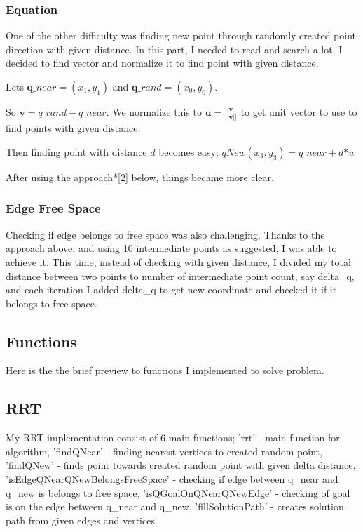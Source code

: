 \documentclass{article}
\begin{document}
		\subsubsection{Equation}
		One of the other difficulty was finding new point through randomly created point direction with given distance. In this part, I needed to read and search a lot. I decided to find vector and normalize it to find point with given distance. \par
		Lets $\mathbf q\_near = (x_1, y_1)$ and $\mathbf q\_rand = (x_0, y_0).$
		
		So $\mathbf v = q\_rand - q\_near $. We normalize this to $\mathbf u = \frac{\mathbf v}{||\mathbf v||}$ to get unit vector to use to find points with given distance.
		
		Then finding point with distance $d$ becomes easy:
		$qNew (x_3, y_3) =  q\_near + d \mathbf * u $
		
		After using the approach*[2] below, things became more clear.
		
		\subsubsection{Edge Free Space}
		Checking if edge belongs to free space was also challenging. Thanks to the approach above, and using 10 intermediate points as suggested, I was able to achieve it. This time, instead of checking with given distance, I divided my total distance between two points to number of intermediate point count, say delta\_q, and each iteration  I added delta\_q to get new coordinate and checked it if it belongs to free space.
	
	\subsection{Functions}
	Here is the the brief preview to functions I implemented to solve problem.
	
		\subsection{RRT}
		My RRT implementation consist of 6 main functions; 'rrt' - main function for algorithm, 'findQNear' - finding nearest vertices to created random point, 'findQNew' - finds point towards created random point with given delta distance, 'isEdgeQNearQNewBelongsFreeSpace' - checking if edge between q\_near and q\_new is belongs to free space, 'isQGoalOnQNearQNewEdge' - checking of goal is on the edge between q\_near and q\_new, 'fillSolutionPath' - creates solution path from given edges and vertices. \par
		
\end{document}
